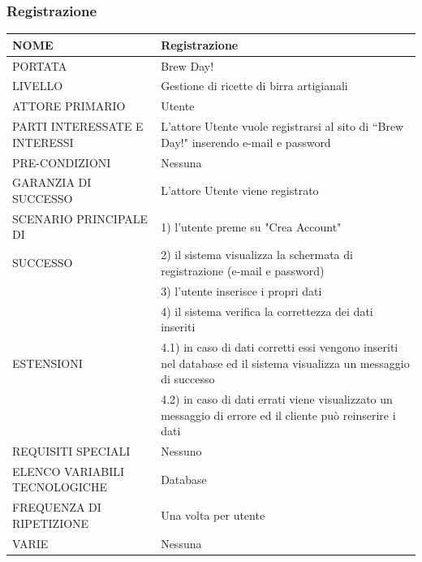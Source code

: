 \documentclass[a4paper, titlepage]{article}
\begin{document}
\subsubsection{Registrazione}
\begin{longtable}{p{6cm}p{7cm}}\toprule
    NOME & Registrazione\\\midrule
    PORTATA & Brew Day!\\\midrule
    LIVELLO & Gestione di ricette di birra artigianali\\\midrule
    ATTORE PRIMARIO & Utente\\\midrule
    PARTI INTERESSATE E INTERESSI & L’attore Utente vuole registrarsi al sito di “Brew Day!" inserendo e-mail e password\\\midrule
    PRE-CONDIZIONI & Nessuna\\\midrule
    GARANZIA DI SUCCESSO & L’attore Utente viene registrato\\\midrule
    SCENARIO PRINCIPALE DI
    & 1) l’utente preme su "Crea Account"\\
    SUCCESSO & 2) il sistema visualizza la schermata di registrazione (e-mail e password)\\
    & 3) l’utente inserisce i propri dati\\
    & 4) il sistema   verifica la correttezza dei dati inseriti\\\midrule
    ESTENSIONI
    & 4.1) in caso di dati corretti essi vengono inseriti
    nel database ed il sistema visualizza un messaggio di successo\\
    & 4.2) in caso di dati errati viene visualizzato un messaggio di errore ed il cliente può reinserire i dati\\\midrule
    REQUISITI SPECIALI & Nessuno\\\midrule
    ELENCO VARIABILI TECNOLOGICHE & Database\\\midrule
    FREQUENZA DI RIPETIZIONE & Una volta per utente\\\midrule
    VARIE & Nessuna\\\bottomrule                                
\end{longtable}
\newpage
\vphantom{}
\end{document}
